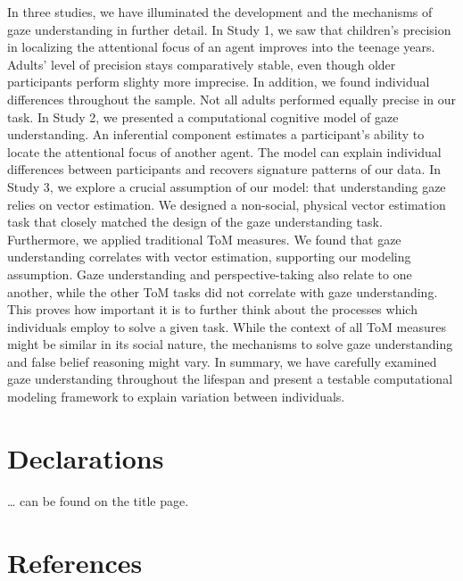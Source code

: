 \documentclass[
  man,mask,floatsintext]{apa6}
\begin{document}
In three studies, we have illuminated the development and the mechanisms of gaze understanding in further detail. In Study 1, we saw that children's precision in localizing the attentional focus of an agent improves into the teenage years. Adults' level of precision stays comparatively stable, even though older participants perform slighty more imprecise. In addition, we found individual differences throughout the sample. Not all adults performed equally precise in our task. In Study 2, we presented a computational cognitive model of gaze understanding. An inferential component estimates a participant's ability to locate the attentional focus of another agent. The model can explain individual differences between participants and recovers signature patterns of our data. In Study 3, we explore a crucial assumption of our model: that understanding gaze relies on vector estimation. We designed a non-social, physical vector estimation task that closely matched the design of the gaze understanding task. Furthermore, we applied traditional ToM measures. We found that gaze understanding correlates with vector estimation, supporting our modeling assumption. Gaze understanding and perspective-taking also relate to one another, while the other ToM tasks did not correlate with gaze understanding. This proves how important it is to further think about the processes which individuals employ to solve a given task. While the context of all ToM measures might be similar in its social nature, the mechanisms to solve gaze understanding and false belief reasoning might vary. In summary, we have carefully examined gaze understanding throughout the lifespan and present a testable computational modeling framework to explain variation between individuals.

\newpage

\hypertarget{declarations}{%
\section{Declarations}\label{declarations}}

\ldots{} can be found on the title page.

\newpage

\hypertarget{references}{%
\section{References}\label{references}}

\begingroup
\setlength{\parindent}{-0.5in}
\setlength{\leftskip}{0.5in}
\end{document}
